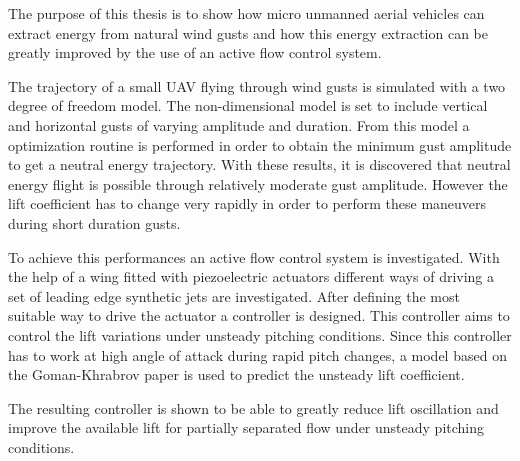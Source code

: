 \par The purpose of this thesis is to show how micro unmanned aerial vehicles can extract energy
from natural wind gusts and how this energy extraction can be greatly improved by the use of
an active flow control system.

\par The trajectory of a small UAV flying through wind gusts is simulated with a two degree of freedom model.
The non-dimensional model is set to include vertical and horizontal gusts of varying amplitude and duration.
From this model a optimization routine is performed in order to obtain the minimum gust amplitude to get a neutral energy trajectory.
With these results, it is discovered that neutral energy flight is possible through relatively moderate gust amplitude.
However the lift coefficient has to change very rapidly in order to perform these maneuvers during short duration gusts. 

\par To achieve this performances an active flow control system is investigated.
With the help of a wing fitted with piezoelectric actuators different ways of driving a set of leading edge synthetic jets are investigated.
After defining the most suitable way to drive the actuator a controller is designed. 
This controller aims to control the lift variations under unsteady pitching conditions.
Since this controller has to work at high angle of attack during rapid pitch changes, a model based on the Goman-Khrabrov paper \cite{GK} is used to predict the unsteady lift coefficient.

\par The resulting controller is shown to be able to greatly reduce lift oscillation and improve the available lift for partially separated flow under unsteady pitching conditions.
